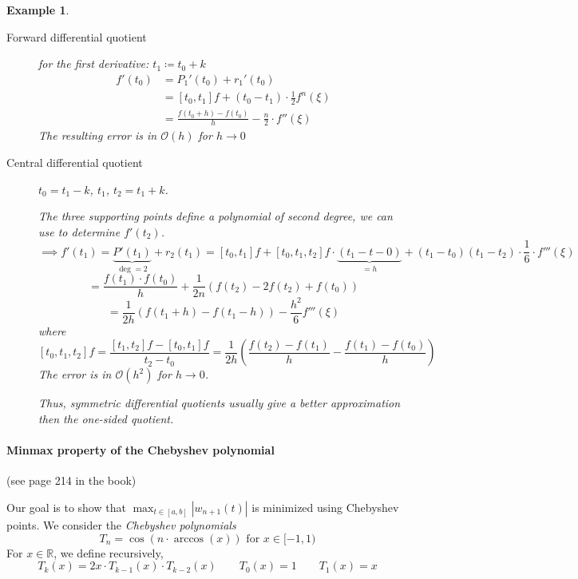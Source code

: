 \documentclass[a4paper]{article}
\newcounter{lecref}[section]
\numberwithin{lecref}{section}
\theoremstyle{break}
\newtheorem{example}[lecref]{Example}
\newcommand{\Abs}[1]{\left|#1\right|}
\begin{document}
\begin{example}
  \label{example:4-16}
  \begin{description}
    \item[Forward differential quotient] for the first derivative: $t_1 \coloneqq t_0 + k$
      \begin{align*}
        f'(t_0) &= P_1'(t_0) + r_1'(t_0) \\
          &= [t_0, t_1] f + (t_0 - t_1) \cdot \frac12 f^n(\xi) \\
          &= \frac{f(t_0 + h) - f(t_0)}{h} - \frac{n}2 \cdot f''(\xi)
      \end{align*}
      The resulting error is in $\mathcal O(h)$ for $h \to 0$
    \item[Central differential quotient]
      $t_0 = t_1 - k$, $t_1$, $t_2 = t_1 + k$.

      The three supporting points define a polynomial of second degree,
      we can use to determine $f'(t_2)$.
      \[ \implies f'(t_1) = \underbrace{P'(t_1)}_{\deg = 2} + r_2(t_1) = [t_0, t_1] f + [t_0, t_1, t_2] f \cdot \underbrace{(t_1 - t-0)}_{= h} + (t_1 - t_0)(t_1 - t_2) \cdot \frac16 \cdot f'''(\xi) \]
      \[ = \frac{f(t_1) \cdot f(t_0)}{h} + \frac1{2n} \left(f(t_2) - 2f(t_2) + f(t_0)\right) \]
      \[ = \frac{1}{2h} (f(t_1 + h) - f(t_1 - h)) - \frac{h^2}{6} f'''(\xi) \]
      where
      \[ [t_0, t_1, t_2] f = \frac{[t_1, t_2] f - [t_0, t_1] f}{t_2 - t_0} = \frac{1}{2h} \left(\frac{f(t_2) - f(t_1)}{h} - \frac{f(t_1) - f(t_0)}{h}\right) \]
      The error is in $\mathcal O(h^2)$ for $h \to 0$.

      Thus, symmetric differential quotients usually give a better approximation then the one-sided quotient.
  \end{description}
\end{example}

\paragraph{Minmax property of the Chebyshev polynomial}

(see page 214 in the book)

Our goal is to show that $\max_{t \in [a, b]} \Abs{w_{n+1}(t)}$ is minimized using Chebyshev points.
We consider the \emph{Chebyshev polynomials}
\[ T_n = \cos(n \cdot \arccos(x)) \text{ for } x \in [-1, 1) \]
For $x \in \mathbb R$, we define recursively,
\[ T_k(x) = 2x \cdot T_{k-1}(x) \cdot T_{k-2}(x) \qquad T_0(x) = 1 \qquad T_1(x) = x \]
\end{document}
